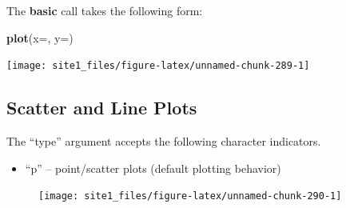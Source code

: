 \documentclass[]{book}
\newenvironment{Shaded}{\begin{snugshade}}{\end{snugshade}}
\newcommand{\KeywordTok}[1]{\textcolor[rgb]{0.13,0.29,0.53}{\textbf{#1}}}
\newcommand{\DataTypeTok}[1]{\textcolor[rgb]{0.13,0.29,0.53}{#1}}
\newcommand{\StringTok}[1]{\textcolor[rgb]{0.31,0.60,0.02}{#1}}
\newcommand{\OperatorTok}[1]{\textcolor[rgb]{0.81,0.36,0.00}{\textbf{#1}}}
\newcommand{\NormalTok}[1]{#1}
\providecommand{\tightlist}{%
  \setlength{\itemsep}{0pt}\setlength{\parskip}{0pt}}
\begin{document}
The \textbf{basic} call takes the following form:

\begin{Shaded}
\begin{Highlighting}[]
\KeywordTok{plot}\NormalTok{(}\DataTypeTok{x=}\NormalTok{, }\DataTypeTok{y=}\NormalTok{)}
\end{Highlighting}
\end{Shaded}

\begin{Shaded}
\end{Shaded}

\begin{center}\texttt{[image: site1\_files/figure-latex/unnamed-chunk-289-1]} \end{center}

\subsection{Scatter and Line Plots}\label{scatter-and-line-plots}

The ``type'' argument accepts the following character indicators.

\begin{itemize}
\tightlist
\item
  ``p'' -- point/scatter plots (default plotting behavior)
\end{itemize}

\begin{Shaded}
\end{Shaded}

\begin{figure}

{\centering \texttt{[image: site1\_files/figure-latex/unnamed-chunk-290-1]} 

}

\caption{ }\label{fig:unnamed-chunk-290}
\end{figure}
\end{document}
